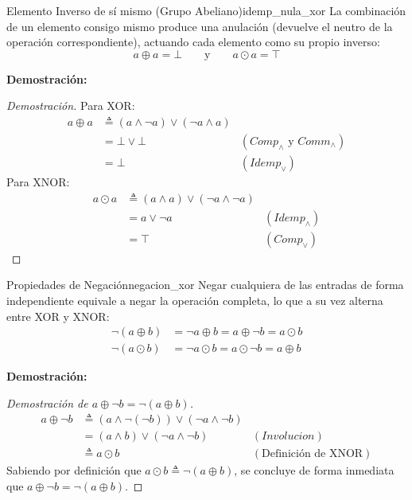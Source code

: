 \documentclass[12pt,a4paper]{article}
\newcommand{\desplegable}[2]{%
  \par\vspace{1ex}\noindent
  \textbf{Demostración:}
  \vspace{1ex}
  
  #2
  \par\vspace{1ex}
}
\begin{document}
\begin{teorema}{Elemento Inverso de sí mismo (Grupo Abeliano)}{idemp_nula_xor}
La combinación de un elemento consigo mismo produce una anulación (devuelve el neutro de la operación correspondiente), actuando cada elemento como su propio inverso:
\[ a \oplus a = \bot \qquad \text{y} \qquad a \odot a = \top \]
\end{teorema}
\desplegable{proof_idemp_nula_xor}{
\begin{proof}[Demostración]
Para XOR:
\begin{align*}
    a \oplus a &\triangleq (a \wedge \neg a) \vee (\neg a \wedge a) \\
               &= \bot \vee \bot & (Comp_\wedge \text{ y } Comm_\wedge) \\
               &= \bot & (Idemp_\vee)
\end{align*}
Para XNOR:
\begin{align*}
    a \odot a &\triangleq (a \wedge a) \vee (\neg a \wedge \neg a) \\
              &= a \vee \neg a & (Idemp_\wedge) \\
              &= \top & (Comp_\vee)
\end{align*}
\end{proof}
}

\begin{teorema}{Propiedades de Negación}{negacion_xor}
Negar cualquiera de las entradas de forma independiente equivale a negar la operación completa, lo que a su vez alterna entre XOR y XNOR:
\begin{align*}
    \neg (a \oplus b) &= \neg a \oplus b = a \oplus \neg b = a \odot b \\
    \neg (a \odot b) &= \neg a \odot b = a \odot \neg b = a \oplus b
\end{align*}
\end{teorema}
\desplegable{proof_negacion_xor}{
\begin{proof}[Demostración de $a \oplus \neg b = \neg(a \oplus b)$]
\begin{align*}
    a \oplus \neg b &\triangleq (a \wedge \neg(\neg b)) \vee (\neg a \wedge \neg b) \\
                    &= (a \wedge b) \vee (\neg a \wedge \neg b) & (Involucion) \\
                    &\triangleq a \odot b & (\text{Definición de XNOR})
\end{align*}
Sabiendo por definición que $a \odot b \triangleq \neg(a \oplus b)$, se concluye de forma inmediata que $a \oplus \neg b = \neg (a \oplus b)$.
\end{proof}
}
\end{document}

